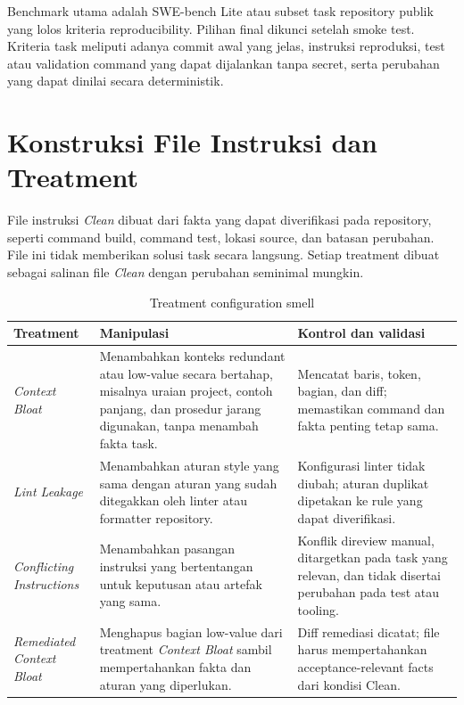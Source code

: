 Benchmark utama adalah SWE-bench Lite atau subset task repository publik yang lolos kriteria reproducibility. Pilihan final dikunci setelah smoke test. Kriteria task meliputi adanya commit awal yang jelas, instruksi reproduksi, test atau validation command yang dapat dijalankan tanpa secret, serta perubahan yang dapat dinilai secara deterministik.

\section{Konstruksi File Instruksi dan Treatment}

File instruksi \textit{Clean} dibuat dari fakta yang dapat diverifikasi pada repository, seperti command build, command test, lokasi source, dan batasan perubahan. File ini tidak memberikan solusi task secara langsung. Setiap treatment dibuat sebagai salinan file \textit{Clean} dengan perubahan seminimal mungkin.

\begin{table}[htbp]
\centering
\small
\renewcommand{\arraystretch}{1.25}
\caption{Treatment configuration smell}
\label{tab:treatment}
\begin{tabularx}{\textwidth}{p{3.2cm}p{4.0cm}Y}
\toprule
\textbf{Treatment} & \textbf{Manipulasi} & \textbf{Kontrol dan validasi} \\
\midrule
\textit{Context Bloat} & Menambahkan konteks redundant atau low-value secara bertahap, misalnya uraian project, contoh panjang, dan prosedur jarang digunakan, tanpa menambah fakta task. & Mencatat baris, token, bagian, dan diff; memastikan command dan fakta penting tetap sama. \\
\textit{Lint Leakage} & Menambahkan aturan style yang sama dengan aturan yang sudah ditegakkan oleh linter atau formatter repository. & Konfigurasi linter tidak diubah; aturan duplikat dipetakan ke rule yang dapat diverifikasi. \\
\textit{Conflicting Instructions} & Menambahkan pasangan instruksi yang bertentangan untuk keputusan atau artefak yang sama. & Konflik direview manual, ditargetkan pada task yang relevan, dan tidak disertai perubahan pada test atau tooling. \\
\textit{Remediated Context Bloat} & Menghapus bagian low-value dari treatment \textit{Context Bloat} sambil mempertahankan fakta dan aturan yang diperlukan. & Diff remediasi dicatat; file harus mempertahankan acceptance-relevant facts dari kondisi Clean. \\
\bottomrule
\end{tabularx}
\end{table}


